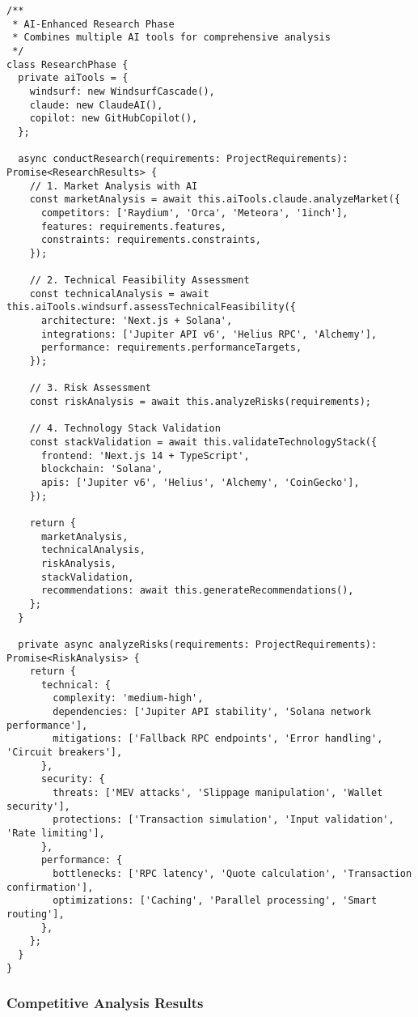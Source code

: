 \documentclass[11pt,a4paper]{article}
\begin{document}
\begin{lstlisting}[style=typescript, caption=Research Automation Workflow]
/**
 * AI-Enhanced Research Phase
 * Combines multiple AI tools for comprehensive analysis
 */
class ResearchPhase {
  private aiTools = {
    windsurf: new WindsurfCascade(),
    claude: new ClaudeAI(),
    copilot: new GitHubCopilot(),
  };

  async conductResearch(requirements: ProjectRequirements): Promise<ResearchResults> {
    // 1. Market Analysis with AI
    const marketAnalysis = await this.aiTools.claude.analyzeMarket({
      competitors: ['Raydium', 'Orca', 'Meteora', '1inch'],
      features: requirements.features,
      constraints: requirements.constraints,
    });

    // 2. Technical Feasibility Assessment
    const technicalAnalysis = await this.aiTools.windsurf.assessTechnicalFeasibility({
      architecture: 'Next.js + Solana',
      integrations: ['Jupiter API v6', 'Helius RPC', 'Alchemy'],
      performance: requirements.performanceTargets,
    });

    // 3. Risk Assessment
    const riskAnalysis = await this.analyzeRisks(requirements);

    // 4. Technology Stack Validation
    const stackValidation = await this.validateTechnologyStack({
      frontend: 'Next.js 14 + TypeScript',
      blockchain: 'Solana',
      apis: ['Jupiter v6', 'Helius', 'Alchemy', 'CoinGecko'],
    });

    return {
      marketAnalysis,
      technicalAnalysis,
      riskAnalysis,
      stackValidation,
      recommendations: await this.generateRecommendations(),
    };
  }

  private async analyzeRisks(requirements: ProjectRequirements): Promise<RiskAnalysis> {
    return {
      technical: {
        complexity: 'medium-high',
        dependencies: ['Jupiter API stability', 'Solana network performance'],
        mitigations: ['Fallback RPC endpoints', 'Error handling', 'Circuit breakers'],
      },
      security: {
        threats: ['MEV attacks', 'Slippage manipulation', 'Wallet security'],
        protections: ['Transaction simulation', 'Input validation', 'Rate limiting'],
      },
      performance: {
        bottlenecks: ['RPC latency', 'Quote calculation', 'Transaction confirmation'],
        optimizations: ['Caching', 'Parallel processing', 'Smart routing'],
      },
    };
  }
}
\end{lstlisting}

\subsubsection{Competitive Analysis Results}
\end{document}
